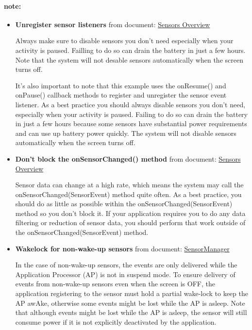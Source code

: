 {
  \small
  \paragraph{note:}
  \begin{itemize}

  \item \textbf{Unregister sensor listeners} from document:
    \href{https://developer.android.com/guide/topics/sensors/sensors_overview.html#sensors-monitor}
    {Sensors Overview}

  Always make sure to disable sensors you don't need especially when your
  activity is paused. Failling to do so can drain the battery in just a few hours.
  Note that the system will not desable sensors automatically when the screen
  turns off.

  It's also important to note that this example uses the onResume() and onPause()
  callback methods to register and unregister the sensor event listener. As a best
  practice you should always disable sensors you don't need, especially when your
  activity is paused. Failing to do so can drain the battery in just a few hours
  because some sensors have substantial power requirements and can use up battery
  power quickly. The system will not disable sensors automatically when the screen
  turns off.
  
\item 
\textbf{Don't block the onSensorChanged() method}
  from document: \href{https://developer.android.com/guide/topics/sensors/sensors_overview.html#sensors-practices}
  {Sensors Overview}

  Sensor data can change at a high rate, which means the system may call the
  onSensorChanged(SensorEvent) method quite often. As a best practice, you should
  do as little as possible within the onSensorChanged(SensorEvent) method so you
  don't block it. If your application requires you to do any data filtering or
  reduction of sensor data, you should perform that work outside of the
  onSensorChanged(SensorEvent) method.

\item 
  \textbf{Wakelock for non-wake-up sensors}
  from document: \href{https://developer.android.com/reference/android/hardware/SensorManager.html#registerListener(android.hardware.SensorEventListener,%20android.hardware.Sensor,%20int,%20int)}
    {SensorManager}


  In the case of non-wake-up sensors, the events are only delivered while the
  Application Processor (AP) is not in suspend mode.
  To ensure delivery of events from non-wake-up sensors even when the
  screen is OFF, the application registering to the sensor must hold a partial
  wake-lock to keep the AP awAke, otherwise some events might be lost while the AP
  is asleep. Note that although events might be lost while the AP is asleep, the
  sensor will still consume power if it is not explicitly deactivated by the
  application.

  \end{itemize}
}


